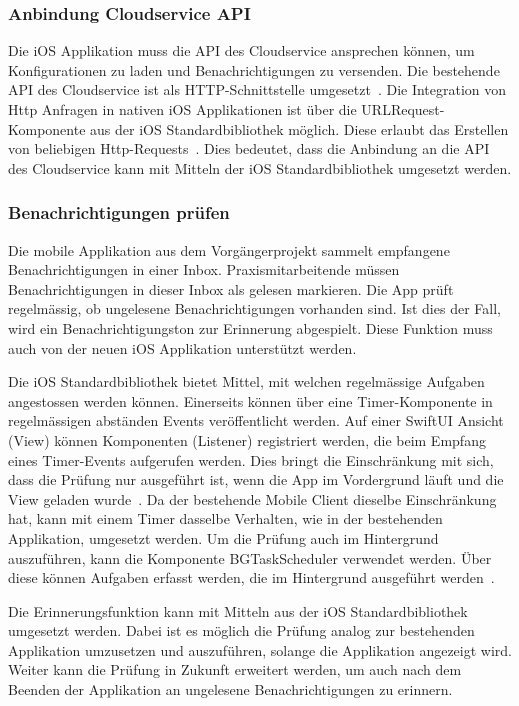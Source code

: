 \subsubsection{Anbindung Cloudservice API}

Die iOS Applikation muss die API des Cloudservice ansprechen können, um Konfigurationen zu laden und Benachrichtigungen zu versenden.
Die bestehende API des Cloudservice ist als HTTP-Schnittstelle umgesetzt~\cite{ip5}.
Die Integration von Http Anfragen in nativen iOS Applikationen ist über die URLRequest-Komponente aus der iOS Standardbibliothek möglich.
Diese erlaubt das Erstellen von beliebigen Http-Requests~\cite{ios_urlrequest}.
Dies bedeutet, dass die Anbindung an die API des Cloudservice kann mit Mitteln der iOS Standardbibliothek umgesetzt werden.

\subsubsection{Benachrichtigungen prüfen}

Die mobile Applikation aus dem Vorgängerprojekt sammelt empfangene Benachrichtigungen in einer Inbox.
Praxismitarbeitende müssen Benachrichtigungen in dieser Inbox als gelesen markieren.
Die App prüft regelmässig, ob ungelesene Benachrichtigungen vorhanden sind.
Ist dies der Fall, wird ein Benachrichtigungston zur Erinnerung abgespielt.
Diese Funktion muss auch von der neuen iOS Applikation unterstützt werden.

Die iOS Standardbibliothek bietet Mittel, mit welchen regelmässige Aufgaben angestossen werden können.
Einerseits können über eine Timer-Komponente in regelmässigen abständen Events veröffentlicht werden.
Auf einer SwiftUI Ansicht (View) können Komponenten (Listener) registriert werden, die beim Empfang eines Timer-Events aufgerufen werden.
Dies bringt die Einschränkung mit sich, dass die Prüfung nur ausgeführt ist, wenn die App im Vordergrund läuft und die View geladen wurde~\cite{ios_timer}.
Da der bestehende Mobile Client dieselbe Einschränkung hat, kann mit einem Timer dasselbe Verhalten, wie in der bestehenden Applikation, umgesetzt werden.
Um die Prüfung auch im Hintergrund auszuführen, kann die Komponente BGTaskScheduler verwendet werden.
Über diese können Aufgaben erfasst werden, die im Hintergrund ausgeführt werden~\cite{ios_bgtaskscheduler}.

Die Erinnerungsfunktion kann mit Mitteln aus der iOS Standardbibliothek umgesetzt werden.
Dabei ist es möglich die Prüfung analog zur bestehenden Applikation umzusetzen und auszuführen, solange die Applikation angezeigt wird.
Weiter kann die Prüfung in Zukunft erweitert werden, um auch nach dem Beenden der Applikation an ungelesene Benachrichtigungen zu erinnern.

